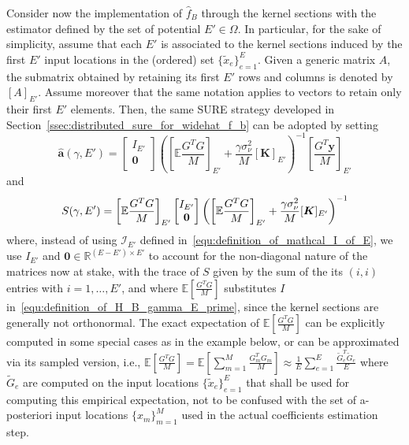 \documentclass[10pt,twocolumn,twoside]{IEEEtran}					%
\theoremstyle	{plain}
\newcommand{\Reals}									[0]	{\mathbb{R}}
\newcommand{\Expectation}					[0]	{\mathbb{E}}
\newcommand{\ExpectationOf}					[1]	{\Expectation \left[ #1 \right]}
\newcommand	{\Section}				[0]	{Section}
\begin{document}
Consider now the implementation of $\widehat{f}_{B}$ through the kernel sections with the estimator defined by the set of potential $E' \in \Omega$. In particular, for the sake of simplicity, assume that each $E'$ is associated to the kernel sections induced by the first $E'$ input locations in the (ordered) set $\{\widetilde{x}_{e}\}_{e=1}^E$. Given a generic matrix $A$, the submatrix obtained by retaining its first $E'$ rows and columns is denoted by $[A]_{E'}$. Assume moreover that the same notation applies to vectors to retain only their first $E'$ elements. Then, the same \ac{SURE} strategy developed in \Section~\ref{ssec:distributed_sure_for_widehat_f_b} can be adopted by setting
\begin{equation}
	\widehat{\bm{a}} \left( \gamma, E' \right)
	=
	\begin{bmatrix}
		I_{E'} \\
		\bm{0} \\
	\end{bmatrix}
	\left(
		\left[\mathbb{E} \frac{G^{T} G}{M} \right]_{E'}
		+
		\frac{\gamma \sigma^{2}_{\nu}}{M} [\bm{K}]_{E'}
	\right)^{-1} \!\!
	\left[ \frac{G^{T} \bm{y}}{M} \right]_{E'}
	\label{equ:widehat_a_gamma_E_prime_with_kernel_sections}
\end{equation}
and
\begin{equation}
	S(\gamma,E')
	=
	\left[\mathbb{E} \frac{G^{T} G}{M} \right]_{E'}
	\begin{bmatrix}
		I_{E'} \\
		\bm{0} \\
	\end{bmatrix}
	\left(
		\left[\mathbb{E} \frac{G^{T} G}{M} \right]_{E'}
		+
		\frac{\gamma \sigma^{2}_{\nu}}{M} [\bm{K}]_{E'}
	\right)^{-1}
	\vspace{0.2cm} 
	\label{equ:S_gamma_E_prime_with_kernel_sections}
\end{equation}
where, instead of using $\mathcal{I}_{E'}$ defined in~\eqref{equ:definition_of_mathcal_I_of_E}, we use $I_{E'}$ and $\bm{0} \in \Reals^{(E - E') \times E'}$ to account for the non-diagonal nature of the matrices now at stake, with the trace of $S$ given by the sum of the its $(i,i)$ entries with $i=1,\ldots,E'$, and where $\ExpectationOf{\frac{G^{T} G}{M}}$ substitutes $I$ in~\eqref{equ:definition_of_H_B_gamma_E_prime}, since the kernel sections are generally not orthonormal. The exact expectation of $\ExpectationOf{\frac{G^{T} G}{M}}$ can be explicitly computed in some special cases as in the example below, or can be approximated via its sampled version, i.e., $\ExpectationOf{\frac{G^{T} G}{M}}=\ExpectationOf{\sum_{m=1}^M\frac{G_m^{T} G_m}{M}} \approx \frac{1}{E}\sum_{e=1}^E\frac{\widetilde{G}_e^{T} \widetilde{G}_e}{E}$ where $\widetilde{G}_e$ are computed on the input locations $\{\widetilde{x}_{e}\}_{e=1}^E$ that shall be used for computing this empirical expectation, not to be confused with the set of a-posteriori input locations $\{{x}_{m}\}_{m=1}^M$ used in the actual coefficients estimation step.
\end{document}
